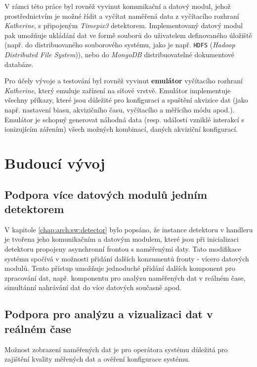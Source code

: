 V rámci této práce byl rovněž vyvinut komunikační a datový modul, jehož prostřednictvím je možné řídit a vyčítat naměřená data z vyčítacího rozhraní \textit{Katherine}, s připojeným \textit{Timepix3} detektorem. Implementovaný datový modul pak umožňuje ukládání dat ve formě souborů do uživatelem definovaného úložiště (např. do distribuovaného souborového systému, jako je např. \texttt{HDFS} (\textit{Hadoop Distributed File System})), nebo do \textit{MongoDB} distribuovatelné dokumentové databáze.

Pro účely vývoje a testování byl rovněž vyvinut \textbf{emulátor} vyčítacího rozhraní \textit{Katherine}, který emuluje zařízení na síťové vrstvě. Emulátor implementuje všechny příkazy, které jsou důležité pro konfiguraci a spuštění akvizice dat (jako např. nastavení biasu, akvizičního času, vyčítacího a měřícího módu apod.). Emulátor je schopný generovat náhodná data (resp. události vzniklé interakcí s ionizujícím zářením) všech možných kombinací, daných akviziční konfigurací.

\section{Budoucí vývoj}
\subsection{Podpora více datových modulů jedním detektorem}
V kapitole \ref{chap:arch:sw:detector} bylo popsáno, že instance detektoru v handleru je tvořena jeho komunikačním a datovým modulem, které jsou při inicializaci detektoru propojeny asynchronní frontou s naměřenými daty. Tato modifikace systému spočívá v možnosti přidání dalších konzumentů fronty - vícero datových modulů. Tento přístup umožňuje jednoduché přidání dalších komponent pro zpracování dat, např. komponentu pro analýzu naměřených dat v reálném čase, simultánní nahrávání dat do více datových současně apod.

\subsection{Podpora pro analýzu a vizualizaci dat v reálném čase}
Možnost zobrazení naměřených dat je pro operátora systému důležitá pro zajištění kvality měřených dat a ověření konfigurace systému. 

